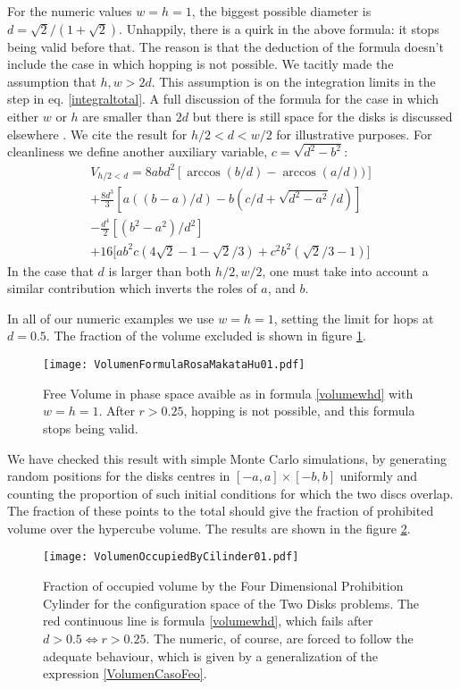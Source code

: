 \documentclass[a4paper,10pt, jcp, aps, preprint]{revtex4-1}
\begin{document}
For the numeric values $w=h=1$, the biggest possible diameter is 
$d=\sqrt{2}/(1+\sqrt{2})$. Unhappily, there is a quirk in the above formula:
it stops being valid before that. The reason is that the deduction
of the formula doesn't include the case in which hopping is not possible. 
We tacitly made the assumption that $h,w>2d$.  This assumption is on 
the integration limits in the step in eq. \ref{integraltotal}. 
A full discussion of the formula for the case in which either
$w$ or $h$ are smaller than $2d$ but there is still space for
the disks is discussed elsewhere \cite{notascalculokarel}. 
We cite the  result for $h/2  <d< w/2$ for illustrative purposes.
For cleanliness we define another auxiliary variable,
$c=\sqrt{d^2-b^2}$:
\begin{multline}\label{VolumenCasoFeo}
V_{h/2<d} = 8abd^2[\arccos(b/d)-\arccos(a/d))]\\
+\frac{8 d^3}{3 }[a((b-a)/d)-b(c/d+\sqrt{d^2-a^2}/d)]\\
-\frac{d^4}{2} [ (b^2-a^2)/d^2]\\ 
+16[ a b^2 c (4\sqrt{2}-1-\sqrt{2}/3)
+c^2b^2 (\sqrt{2}/3-1) \big]
\end{multline}
In the case that $d$ is larger than both $h/2, w/2$, one must take
into account a similar
contribution which inverts the roles of $a$, and $b$.

In all of our numeric examples we use $w=h=1$, setting the
limit for hops at $d=0.5$. The fraction of the volume
excluded is shown in
figure  \ref{VolFRM}.

\begin{figure}[h]
\centering
\texttt{[image: VolumenFormulaRosaMakataHu01.pdf]}
\caption{Free Volume in phase space avaible as in formula \ref{volumewhd} 
with  $w=h=1$. After $r>0.25$, hopping is not possible, and this
formula stops being valid.}
\label{VolFRM}
\end{figure}

We have checked this result with simple Monte Carlo simulations, 
by generating random positions for the disks centres in 
$[-a,a] \times [-b,b]$ uniformly and 
counting the proportion of such initial conditions for 
which the two discs overlap. The fraction of these points to the 
total should give the fraction of prohibited volume over the hypercube
volume. The results are shown in the figure \ref{VolMonteC}.

\begin{figure}[h]
\centering
\texttt{[image: VolumenOccupiedByCilinder01.pdf]}
\caption{Fraction of occupied volume by the 
Four Dimensional Prohibition Cylinder for the configuration space of the 
Two Disks problems. The red continuous line is formula \ref{volumewhd}, 
which fails after $d>0.5\Leftrightarrow r>0.25$. The numeric,
of course, are forced to follow the adequate behaviour, which is given
by a generalization of the expression \ref{VolumenCasoFeo}. 
 }\label{VolMonteC}
\end{figure}
\end{document}
